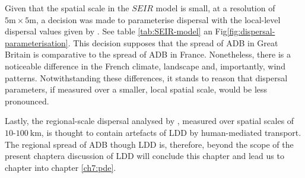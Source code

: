 Given that the spatial scale in the $SEIR$ model is small, at a  resolution of $5\mathrm{m} \times 5\mathrm{m}$, a decision was made to parameterise dispersal with the local-level dispersal values given by \cite{grosdidier2018tracking}. See table \ref{tab:SEIR-model} an Fig\ref{fig:dispersal-parameterisation}. This decision supposes that the spread of ADB in Great Britain is comparative to the spread of ADB in France. Nonetheless, there is a noticeable difference in the French climate, landscape and, importantly, wind patterns. %
Notwithstanding these differences, it stands to reason that dispersal parameters, if measured over a smaller, local spatial scale, would be less pronounced. 

Lastly, the regional-scale dispersal analysed by \cite{grosdidier2018tracking}, measured over spatial scales of $10$-$100\ \mathrm{km}$, is thought to contain artefacts of LDD by human-mediated transport. The regional spread of ADB though LDD is, therefore, beyond the scope of the present chapter\textemdash a discussion of LDD will conclude this chapter and lead us to chapter into chapter \ref{ch7:pde}.



